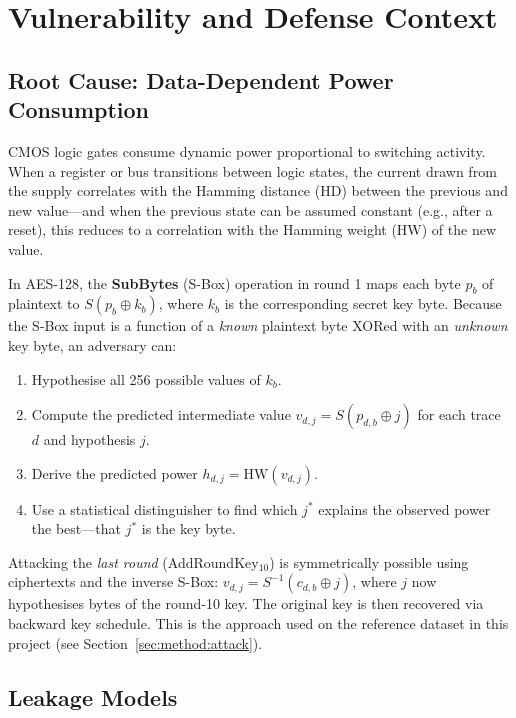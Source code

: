 \section{Vulnerability and Defense Context}
\label{sec:vuln}

\subsection{Root Cause: Data-Dependent Power Consumption}

CMOS logic gates consume dynamic power proportional to switching activity.
When a register or bus transitions between logic states, the current drawn
from the supply correlates with the Hamming distance (HD) between the previous
and new value---and when the previous state can be assumed constant (e.g.,
after a reset), this reduces to a correlation with the Hamming weight (HW) of
the new value.

In AES-128, the \textbf{SubBytes} (S-Box) operation in round 1 maps each byte
$p_b$ of plaintext to $S(p_b \oplus k_b)$, where $k_b$ is the corresponding
secret key byte.
Because the S-Box input is a function of a \emph{known} plaintext byte XORed
with an \emph{unknown} key byte, an adversary can:

\begin{enumerate}
  \item Hypothesise all 256 possible values of $k_b$.
  \item Compute the predicted intermediate value $v_{d,j} = S(p_{d,b} \oplus j)$
        for each trace $d$ and hypothesis $j$.
  \item Derive the predicted power $h_{d,j} = \mathrm{HW}(v_{d,j})$.
  \item Use a statistical distinguisher to find which $j^*$ explains the
        observed power the best---that $j^*$ is the key byte.
\end{enumerate}

Attacking the \emph{last round} (AddRoundKey$_{10}$) is symmetrically
possible using ciphertexts and the inverse S-Box:
$v_{d,j} = S^{-1}(c_{d,b} \oplus j)$,
where $j$ now hypothesises bytes of the round-10 key.
The original key is then recovered via backward key schedule.
This is the approach used on the reference dataset in this project (see
Section~\ref{sec:method:attack}).

\subsection{Leakage Models}

